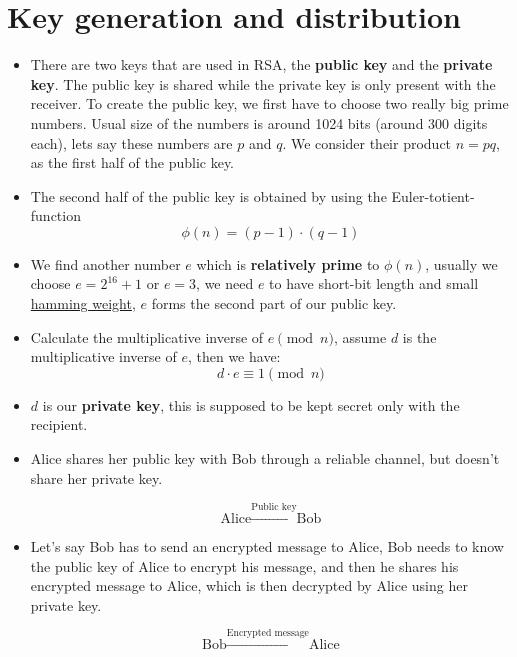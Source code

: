\documentclass[12pt,a4paper]{report}
\begin{document}
\section{Key generation and distribution}

    \begin{itemize}
    \item There are two keys that are used in RSA, the \textbf{public key} and the \textbf{private key}. The public key is shared while the private key is only present with the receiver. To create the public key, we first have to choose two really big prime numbers. Usual size of the numbers is around 1024 bits (around 300 digits each), lets say these numbers are $p$ and $q$. We consider their product $n = pq$, as the first half of the public key.
    
    \item The second half of the public key is obtained by using the Euler-totient-function
    \[
        \phi(n) = (p-1) \cdot (q-1)
    \]
    
    \item We find another number $e$ which is \textbf{relatively prime} to $\phi(n)$, usually we choose $e = 2^{16} + 1$ or $e = 3$, we need $e$ to have short-bit length and small \href{https://en.wikipedia.org/wiki/Hamming_weight}{hamming weight}, $e$ forms the second part of our public key.
    
    \item Calculate the multiplicative inverse of $e \pmod{n}$, assume $d$ is the multiplicative inverse of $e$, then we have:
    \[
        d \cdot e \equiv 1 \pmod{n}
    \]
    
    \item $d$ is our \textbf{private key}, this is supposed to be kept secret only with the recipient.
    
    \item Alice shares her public key with Bob through a reliable channel, but doesn't share her private key.
    
    \[
        \text{Alice} \xrightarrow{\text{Public key}} \text{Bob}
    \]
    
    \item Let's say Bob has to send an encrypted message to Alice, Bob needs to know the public key of Alice to encrypt his message, and then he shares his encrypted message to Alice, which is then decrypted by Alice using her private key.
    
    \[
        \text{Bob} \xrightarrow{\text{Encrypted message}} \text{Alice}
    \]
\end{itemize}
\end{document}
